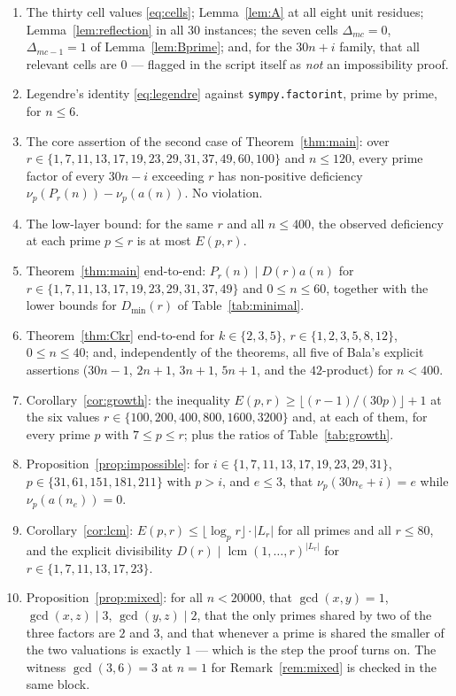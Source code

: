 \documentclass[11pt]{article}
\theoremstyle{plain}
\theoremstyle{definition}
\theoremstyle{remark}
\numberwithin{equation}{section}
\newcommand{\Lr}{L_r}
\DeclareMathOperator{\lcm}{lcm}
\begin{document}
\begin{enumerate}
\item The thirty cell values \eqref{eq:cells}; Lemma~\ref{lem:A} at all eight unit residues;
Lemma~\ref{lem:reflection} in all $30$ instances; the seven cells $\Delta_{mc}=0$,
$\Delta_{mc-1}=1$ of Lemma~\ref{lem:Bprime}; and, for the $30n+i$ family, that all relevant cells
are $0$ --- flagged in the script itself as \emph{not} an impossibility proof.

\item Legendre's identity \eqref{eq:legendre} against \texttt{sympy.factorint}, prime by prime,
for $n \le 6$.

\item The core assertion of the second case of Theorem~\ref{thm:main}: over
$r \in \{1,7,11,13,17,19,23,29,31,37,49,60,100\}$ and $n \le 120$, every prime factor of every
$30n-i$ exceeding $r$ has non-positive deficiency $\nu_p(P_r(n)) - \nu_p(a(n))$. No violation.

\item The low-layer bound: for the same $r$ and all $n \le 400$, the observed deficiency at each
prime $p \le r$ is at most $E(p,r)$.

\item Theorem~\ref{thm:main} end-to-end: $P_r(n) \mid D(r)a(n)$ for
$r \in \{1,7,11,13,17,19,23,29,31,37,49\}$ and $0 \le n \le 60$, together with the lower bounds
for $D_{\min}(r)$ of Table~\ref{tab:minimal}.

\item Theorem~\ref{thm:Ckr} end-to-end for $k \in \{2,3,5\}$, $r \in \{1,2,3,5,8,12\}$,
$0 \le n \le 40$; and, independently of the theorems, all five of Bala's explicit assertions
($30n-1$, $2n+1$, $3n+1$, $5n+1$, and the $42$-product) for $n < 400$.

\item Corollary~\ref{cor:growth}: the inequality $E(p,r) \ge \lfloor (r-1)/(30p)\rfloor + 1$ at
the six values $r \in \{100, 200, 400, 800, 1600, 3200\}$ and, at each of them, for every prime
$p$ with $7 \le p \le r$; plus the ratios of Table~\ref{tab:growth}.

\item Proposition~\ref{prop:impossible}: for $i \in \{1,7,11,13,17,19,23,29,31\}$,
$p \in \{31,61,151,181,211\}$ with $p>i$, and $e \le 3$, that $\nu_p(30n_e+i) = e$ while
$\nu_p(a(n_e)) = 0$.

\item Corollary~\ref{cor:lcm}: $E(p,r) \le \lfloor\log_p r\rfloor\cdot|\Lr|$ for all primes and
all $r \le 80$, and the explicit divisibility $D(r) \mid \lcm(1,\dots,r)^{|\Lr|}$ for
$r \in \{1,7,11,13,17,23\}$.

\item Proposition~\ref{prop:mixed}: for all $n < 20000$, that $\gcd(x,y)=1$, $\gcd(x,z)\mid 3$,
$\gcd(y,z)\mid 2$, that the only primes shared by two of the three factors are $2$ and $3$, and
that whenever a prime is shared the smaller of the two valuations is exactly $1$ --- which is the
step the proof turns on. The witness $\gcd(3,6)=3$ at $n=1$ for Remark~\ref{rem:mixed} is checked
in the same block.
\end{enumerate}
\end{document}
